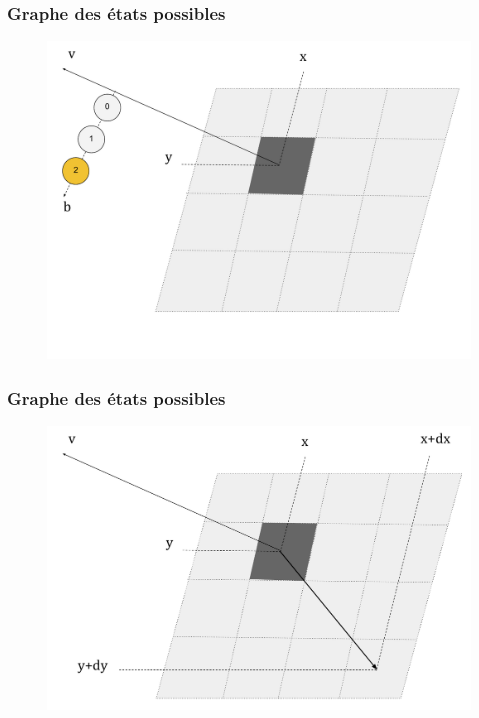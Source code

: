 \documentclass[c]{beamer}
\begin{document}
\begin{frame}[label=structures3]
\transdissolve[duration=1]
\frametitle{Graphe des états possibles}
\begin{figure}[!h]
\centering
\includegraphics[scale=0.3]{fig/g003.pdf}
\end{figure}
\end{frame}

\begin{frame}[label=structures4]
\transdissolve[duration=1]
\frametitle{Graphe des états possibles}
\begin{figure}[!h]
\centering
\includegraphics[scale=0.3]{fig/g004.pdf}
\end{figure}
\end{frame}
\end{document}
